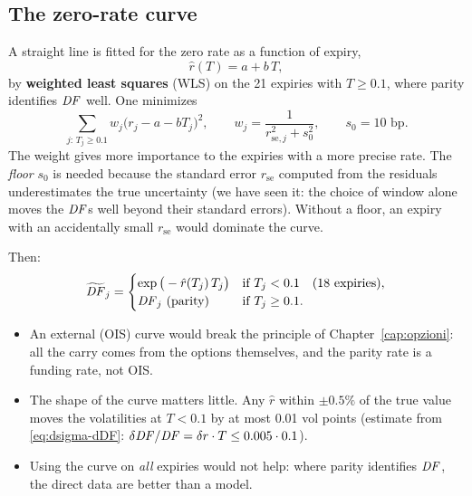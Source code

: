 \subsection{The zero-rate curve}
A straight line is fitted for the zero rate as a function of expiry,
\begin{equation}\label{eq:curva-zero}
\hat r(T)=a+b\,T,
\end{equation}
by \textbf{weighted least squares} (WLS) on the 21 expiries with $T\ge0.1$, where parity identifies $\mathit{DF}$ well. One
minimizes
\begin{equation}\label{eq:wls}
\sum_{j:\,T_j\ge0.1}w_j\big(r_j-a-bT_j\big)^2,\qquad w_j=\frac{1}{r_{\mathrm{se},j}^2+s_0^2},\qquad s_0=10\text{ bp}.
\end{equation}
The weight gives more importance to the expiries with a more precise rate. The \emph{floor} $s_0$ is needed because
the standard error $r_{\mathrm{se}}$ computed from the residuals underestimates the true uncertainty (we have seen it:
the choice of window alone moves the $\mathit{DF}$s well beyond their standard errors). Without a floor, an expiry with an
accidentally small $r_{\mathrm{se}}$ would dominate the curve.

Then:
\begin{equation}\label{eq:DF-curva}
\widetilde{\mathit{DF}}_j=
\begin{cases}
\exp\big(-\hat r(T_j)\,T_j\big) & \text{if } T_j<0.1 \quad\text{(18 expiries)},\\
\mathit{DF}_j\ \text{(parity)} & \text{if } T_j\ge0.1 .
\end{cases}
\end{equation}

\begin{perche}[title={Why a straight line, and why not an external OIS curve?}]
\begin{itemize}
\item An external (OIS) curve would break the principle of Chapter~\ref{cap:opzioni}: all the carry comes from the
options themselves, and the parity rate is a funding rate, not OIS.
\item The shape of the curve matters little. Any $\hat r$ within $\pm0.5\%$ of the true value moves the volatilities
at $T<0.1$ by at most 0.01 vol points (estimate from \eqref{eq:dsigma-dDF}: $\delta\mathit{DF}/\mathit{DF}=\delta r\cdot
T\le0.005\cdot0.1$).
\item Using the curve on \emph{all} expiries would not help: where parity identifies $\mathit{DF}$, the direct data are
better than a model.
\end{itemize}
\end{perche}

